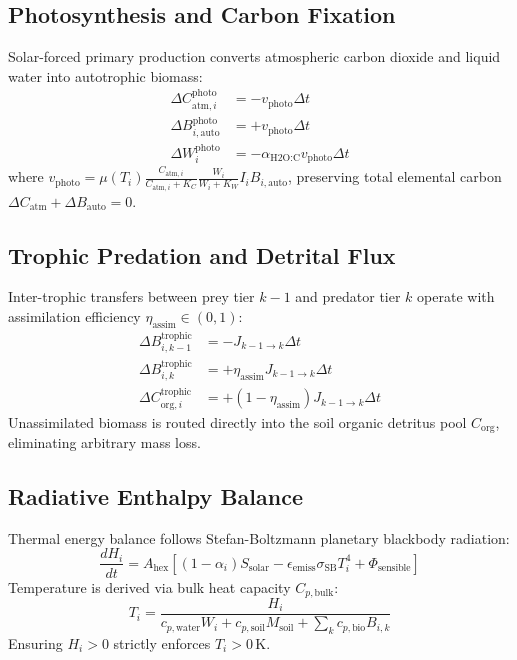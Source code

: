 \documentclass[10pt,twocolumn,letterpaper]{article}
\begin{document}
\subsection{Photosynthesis and Carbon Fixation}
Solar-forced primary production converts atmospheric carbon dioxide and liquid water into autotrophic biomass:
\begin{align}
\Delta C_{\text{atm}, i}^{\text{photo}} &= -v_{\text{photo}} \Delta t \\
\Delta B_{i, \text{auto}}^{\text{photo}} &= +v_{\text{photo}} \Delta t \\
\Delta W_i^{\text{photo}} &= -\alpha_{\text{H2O:C}} v_{\text{photo}} \Delta t
\end{align}
where $v_{\text{photo}} = \mu(T_i) \frac{C_{\text{atm}, i}}{C_{\text{atm}, i} + K_C} \frac{W_i}{W_i + K_W} I_i B_{i, \text{auto}}$, preserving total elemental carbon $\Delta C_{\text{atm}} + \Delta B_{\text{auto}} = 0$.

\subsection{Trophic Predation and Detrital Flux}
Inter-trophic transfers between prey tier $k-1$ and predator tier $k$ operate with assimilation efficiency $\eta_{\text{assim}} \in (0, 1)$:
\begin{align}
\Delta B_{i, k-1}^{\text{trophic}} &= -J_{k-1 \to k} \Delta t \\
\Delta B_{i, k}^{\text{trophic}} &= +\eta_{\text{assim}} J_{k-1 \to k} \Delta t \\
\Delta C_{\text{org}, i}^{\text{trophic}} &= +(1 - \eta_{\text{assim}}) J_{k-1 \to k} \Delta t
\end{align}
Unassimilated biomass is routed directly into the soil organic detritus pool $C_{\text{org}}$, eliminating arbitrary mass loss.

\subsection{Radiative Enthalpy Balance}
Thermal energy balance follows Stefan-Boltzmann planetary blackbody radiation:
\begin{equation}
\frac{dH_i}{dt} = A_{\text{hex}} \left[ (1 - \alpha_i) S_{\text{solar}} - \epsilon_{\text{emiss}} \sigma_{\text{SB}} T_i^4 + \Phi_{\text{sensible}} \right]
\end{equation}
Temperature is derived via bulk heat capacity $C_{p, \text{bulk}}$:
\begin{equation}
T_i = \frac{H_i}{c_{p, \text{water}} W_i + c_{p, \text{soil}} M_{\text{soil}} + \sum_k c_{p, \text{bio}} B_{i, k}}
\end{equation}
Ensuring $H_i > 0$ strictly enforces $T_i > 0\,\text{K}$.
\end{document}
